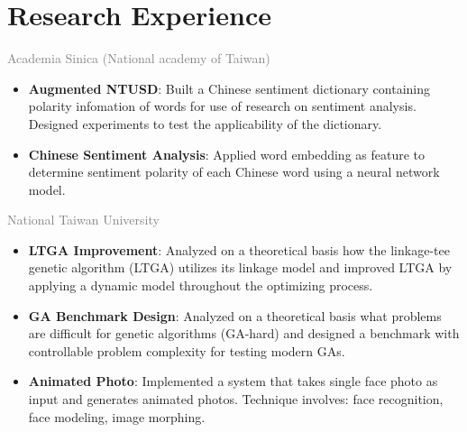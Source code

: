\documentclass[a4paper,10pt]{article}
\begin{document}
\section{Research Experience}
\textcolor{gray}{Academia Sinica (National academy of Taiwan)}
\begin{itemize}
    \item \textbf{Augmented NTUSD}: Built a Chinese sentiment dictionary containing polarity infomation of words for use of research on sentiment analysis. Designed experiments to test the applicability of the dictionary.
    \item \textbf{Chinese Sentiment Analysis}: Applied word embedding as feature to determine sentiment polarity of each Chinese word using a neural network model.
\end{itemize}
\textcolor{gray}{National Taiwan University}
\begin{itemize}
    \item \textbf{LTGA Improvement}: Analyzed on a theoretical basis how the linkage-tee genetic algorithm (LTGA) utilizes its linkage model and improved LTGA by applying a dynamic model throughout the optimizing process.
    \item \textbf{GA Benchmark Design}: Analyzed on a theoretical basis what problems are difficult for genetic algorithms (GA-hard) and designed a benchmark with controllable problem complexity for testing modern GAs.
    \item \textbf{Animated Photo}: Implemented a system that takes single face photo as input and generates animated photos. Technique involves: face recognition, face modeling, image morphing.
\end{itemize}


\end{document}
